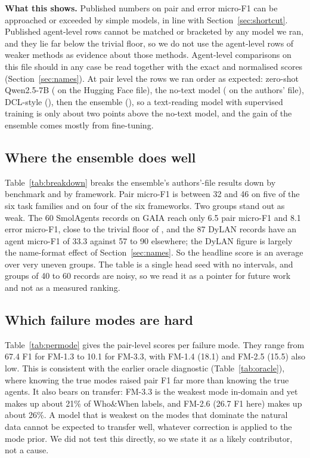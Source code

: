 \documentclass[conference]{IEEEtran}
\begin{document}
\textbf{What this shows.} Published numbers on pair and error micro-F1 can be approached or exceeded by simple models, in line with Section~\ref{sec:shortcut}. Published agent-level rows cannot be matched or bracketed by any model we ran, and they lie far below the trivial floor, so we do not use the agent-level rows of weaker methods as evidence about those methods. Agent-level comparisons on this file should in any case be read together with the exact and normalised scores (Section~\ref{sec:names}). At pair level the rows we ran order as expected: zero-shot Qwen2.5-7B (\rpQwPair{} on the Hugging Face file), the no-text model (\shortAEpair{} on the authors' file), DCL-style (\rpDclPair), then the ensemble (\ensAEpair), so a text-reading model with supervised training is only about two points above the no-text model, and the gain of the ensemble comes mostly from fine-tuning.



\subsection{Where the ensemble does well}
Table~\ref{tab:breakdown} breaks the ensemble's authors'-file results down by benchmark and by framework. Pair micro-F1 is between 32 and 46 on five of the six task families and on four of the six frameworks. Two groups stand out as weak. The 60 SmolAgents records on GAIA reach only 6.5 pair micro-F1 and 8.1 error micro-F1, close to the trivial floor of \floorAE, and the 87 DyLAN records have an agent micro-F1 of 33.3 against 57 to 90 elsewhere; the DyLAN figure is largely the name-format effect of Section~\ref{sec:names}. So the headline score is an average over very uneven groups. The table is a single head seed with no intervals, and groups of 40 to 60 records are noisy, so we read it as a pointer for future work and not as a measured ranking.



\subsection{Which failure modes are hard}
Table~\ref{tab:permode} gives the pair-level scores per failure mode. They range from 67.4 F1 for FM-1.3 to 10.1 for FM-3.3, with FM-1.4 (18.1) and FM-2.5 (15.5) also low. This is consistent with the earlier oracle diagnostic (Table~\ref{tab:oracle}), where knowing the true modes raised pair F1 far more than knowing the true agents. It also bears on transfer: FM-3.3 is the weakest mode in-domain and yet makes up about 21\% of Who\&When labels, and FM-2.6 (26.7 F1 here) makes up about 26\%. A model that is weakest on the modes that dominate the natural data cannot be expected to transfer well, whatever correction is applied to the mode prior. We did not test this directly, so we state it as a likely contributor, not a cause.
\end{document}
